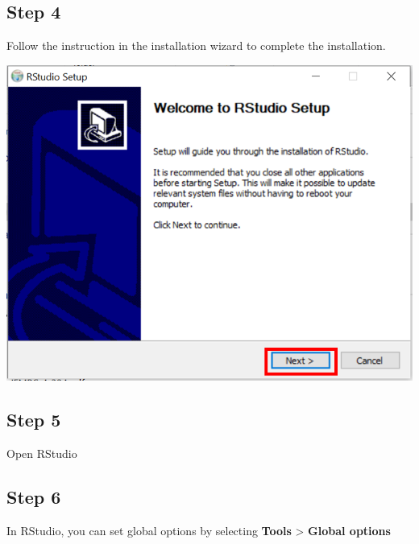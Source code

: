 \documentclass[
  letterpaper,
  DIV=11,
  numbers=noendperiod,
  oneside]{scrreprt}
\begin{document}
\subsection{Step 4}

Follow the instruction in the installation wizard to complete the
installation.

\includegraphics{images/paste-427EA827.png}

\subsection{Step 5}

Open RStudio

\subsection{Step 6}

In RStudio, you can set global options by selecting \textbf{Tools}
\textgreater{} \textbf{Global options}
\end{document}
